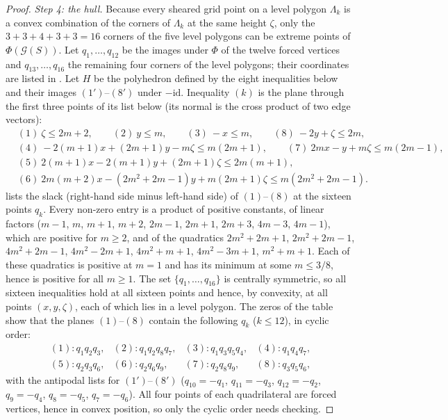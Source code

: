 \begin{proof}
\emph{Step 4: the hull.}
Because every sheared grid point on a level polygon $\Lambda_k$ is a convex combination of the corners of $\Lambda_k$ at the same height $\zeta$, only the $3+3+4+3+3=16$ corners of the five level polygons can be extreme points of $\Phi(\mathcal G(S))$.
Let $q_1,\dots,q_{12}$ be the images under $\Phi$ of the twelve forced vertices and $q_{13},\dots,q_{16}$ the remaining four corners of the level polygons; their coordinates are listed in .
Let $H$ be the polyhedron defined by the eight inequalities below and their images $(1')$--$(8')$ under $-\mathrm{id}$.
Inequality $(k)$ is the plane through the first three points of its list below (its normal is the cross product of two edge vectors):
\begin{align*}
&(1)\ \zeta\le 2m+2, \qquad (2)\ y\le m, \qquad (3)\ -x\le m, \qquad (8)\ -2y+\zeta\le 2m,\\
&(4)\ -2(m{+}1)x+(2m{+}1)y-m\zeta\le m(2m{+}1),\qquad (7)\ 2mx-y+m\zeta\le m(2m{-}1),\\
&(5)\ 2(m{+}1)x-2(m{+}1)y+(2m{+}1)\zeta\le 2m(m{+}1),\\
&(6)\ 2m(m{+}2)x-(2m^2{+}2m{-}1)y+m(2m{+}1)\zeta\le m(2m^2{+}2m{-}1).
\end{align*}
 lists the slack (right-hand side minus left-hand side) of $(1)$--$(8)$ at the sixteen points $q_k$.
Every non-zero entry is a product of positive constants, of linear factors ($m-1$, $m$, $m+1$, $m+2$, $2m-1$, $2m+1$, $2m+3$, $4m-3$, $4m-1$), which are positive for $m\ge2$, and of the quadratics $2m^2+2m+1$, $2m^2+2m-1$, $4m^2+2m-1$, $4m^2-2m+1$, $4m^2+m+1$, $4m^2-3m+1$, $m^2+m+1$.
Each of these quadratics is positive at $m=1$ and has its minimum at some $m\le3/8$, hence is positive for all $m\ge1$.
The set $\{q_1,\dots,q_{16}\}$ is centrally symmetric, so all sixteen inequalities hold at all sixteen points and hence, by convexity, at all points $(x,y,\zeta)$, each of which lies in a level polygon.
The zeros of the table show that the planes $(1)$--$(8)$ contain the following $q_k$ ($k\le12$), in cyclic order:
\[
\begin{array}{llll}
(1)\colon q_1q_2q_3, & (2)\colon q_1q_2q_8q_7, & (3)\colon q_1q_3q_5q_4, & (4)\colon q_1q_4q_7,\\
(5)\colon q_2q_3q_6, & (6)\colon q_2q_6q_9, & (7)\colon q_2q_8q_9, & (8)\colon q_3q_5q_6,
\end{array}
\]
with the antipodal lists for $(1')$--$(8')$ ($q_{10}=-q_1$, $q_{11}=-q_3$, $q_{12}=-q_2$, $q_9=-q_4$, $q_8=-q_5$, $q_7=-q_6$).
All four points of each quadrilateral are forced vertices, hence in convex position, so only the cyclic order needs checking.

\end{proof}
